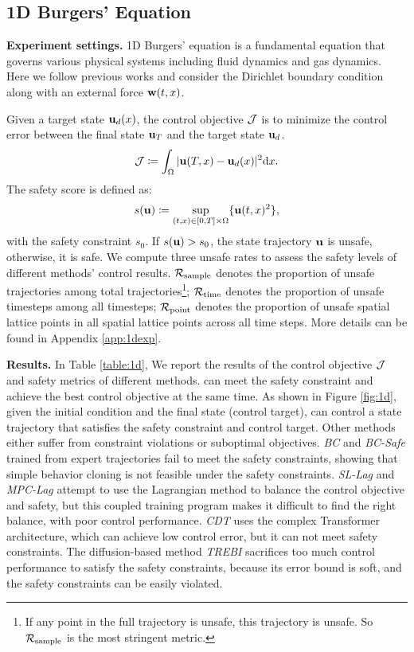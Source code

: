 \subsection{1D Burgers' Equation}
\label{sec:1d}
\textbf{Experiment settings.}
1D Burgers' equation is a fundamental equation that governs various physical systems including fluid dynamics and gas dynamics. Here we follow previous works \citep{hwang2022solving,mowlavi2023optimal} and consider the Dirichlet boundary condition along with an external force \(\mathbf{w} (t,x) \). 

Given a target state $\mathbf{u}_d(x)$, the control objective $\mathcal{J}$ is to minimize the control error between the final state $\mathbf{u}_T$ and the target state $\mathbf{u}_d$.
\begin{equation}
\label{eq:burgers_obj_J_actual}
\mathcal{J}\coloneqq\int_{\Omega}|\mathbf{u}(T,x) - \mathbf{u}_d(x)|^2\mathrm{d}x.
\end{equation}
The safety score is defined as:
\begin{equation}
    s(\mathbf{u}) \coloneqq \sup_{(t,x) \in [0,T] \times \Omega}\{\mathbf{u}(t,x)^2\},
\end{equation}\label{eq:burgers_safety_score}
with the safety constraint $s_0$. If $s(\mathbf{u})>s_0$, the state trajectory $\mathbf{u}$ is unsafe, otherwise, it is safe. We compute three unsafe rates to assess the safety levels of different methods' control results. $\mathcal{R}_{\text{sample}}$ denotes the proportion of unsafe trajectories among total trajectories\footnote{If any point in the full trajectory is unsafe, this trajectory is unsafe. So $\mathcal{R}_{\text{sample}}$ is the most stringent metric.}; $\mathcal{R}_{\text{time}}$ denotes the proportion of unsafe timesteps among all timesteps; $\mathcal{R}_{\text{point}}$ denotes the proportion of unsafe spatial lattice points in all spatial lattice points across all time steps. More details can be found in Appendix \ref{app:1dexp}. 


\textbf{Results.} In Table \ref{table:1d}, We report the results of the control objective $\mathcal{J}$ and safety metrics of different methods. \proj can meet the safety constraint and achieve the best control objective at the same time. As shown in Figure \ref{fig:1d}, given the initial condition and the final state (control target), \proj can control a state trajectory that satisfies the safety constraint and control target. Other methods either suffer from constraint violations or suboptimal objectives. \textit{BC} and \textit{BC-Safe} trained from expert trajectories fail to meet the safety constraints, showing that simple behavior cloning is not feasible under the safety constraints. \textit{SL-Lag} and \textit{MPC-Lag} attempt to use the Lagrangian method to balance the control objective and safety, but this coupled training program makes it difficult to find the right balance, with poor control performance. \textit{CDT} uses the complex Transformer architecture, which can achieve low control error, but it can not
meet safety constraints. The diffusion-based method \textit{TREBI} sacrifices too much control performance to satisfy the safety constraints, because its error bound is soft, and the safety constraints can be easily violated.  


